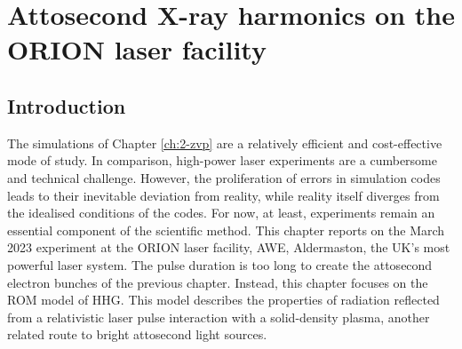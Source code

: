 \chapter{\label{ch:3-orion}Attosecond X-ray harmonics on the ORION laser facility} 

\minitoc

\section{Introduction}
The simulations of Chapter \ref{ch:2-zvp} are a relatively efficient and cost-effective mode of study. In comparison, high-power laser experiments are a cumbersome and technical challenge. However, the proliferation of errors in simulation codes leads to their inevitable deviation from reality, while reality itself diverges from the idealised conditions of the codes. For now, at least, experiments remain an essential component of the scientific method. This chapter reports on the March 2023 experiment at the ORION laser facility, AWE, Aldermaston, the UK's most powerful laser system. The pulse duration is too long to create the attosecond electron bunches of the previous chapter. Instead, this chapter focuses on the ROM model of HHG. This model describes the properties of radiation reflected from a relativistic laser pulse interaction with a solid-density plasma, another related route to bright attosecond light sources. 

